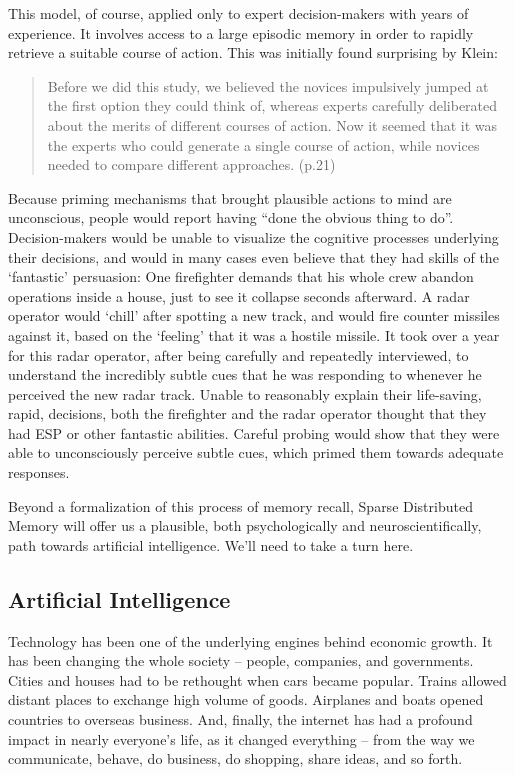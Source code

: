 This model, of course, applied only to expert decision-makers with years of experience.  It involves access to a large episodic memory in order to rapidly retrieve a suitable course of action.  This was initially found surprising by Klein:

\begin{quote}
	Before we did this study, we believed the novices impulsively jumped at the first option they could think of, whereas experts carefully deliberated about the merits of different courses of action.  Now it seemed that it was the experts who could generate a single course of action, while novices needed to compare different approaches. (p.21)
\end{quote}

Because priming mechanisms that brought plausible actions to mind are unconscious, people would report having ``done the obvious thing to do''.  Decision-makers would be unable to visualize the cognitive processes underlying their decisions, and would in many cases even believe that they had skills of the `fantastic' persuasion:  One firefighter demands that his whole crew abandon operations inside a house, just to see it collapse seconds afterward.  A radar operator would `chill' after spotting a new track, and would fire counter missiles against it, based on the `feeling' that it was a hostile missile.  It took over a year for this radar operator, after being carefully and repeatedly interviewed, to understand the incredibly subtle cues that he was responding to whenever he perceived the new radar track.  Unable to reasonably explain their life-saving, rapid, decisions, both the firefighter and the radar operator thought that they had ESP or other fantastic abilities. Careful probing would show that they were able to unconsciously perceive subtle cues, which primed them towards adequate responses.

Beyond a formalization of this process of memory recall, Sparse Distributed Memory will offer us a plausible, both psychologically and neuroscientifically, path towards artificial intelligence.  We'll need to take a turn here.

\subsection{Artificial Intelligence}


Technology has been one of the underlying engines behind economic growth. It has been changing the whole society -- people, companies, and governments. Cities and houses had to be rethought when cars became popular. Trains allowed distant places to exchange high volume of goods. Airplanes and boats opened countries to overseas business. And, finally, the internet has had a profound impact in nearly everyone's life, as it changed everything -- from the way we communicate, behave, do business, do shopping, share ideas, and so forth.

